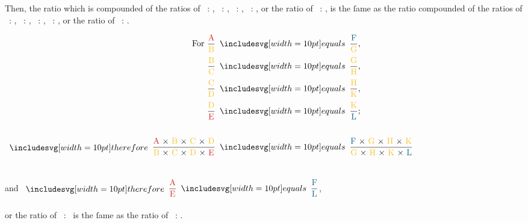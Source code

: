 \documentclass[11pt,preview]{standalone}
\begin{document}
\raggedright Then, the ratio which is compounded of the ratios of \redA\ : \yellowB, \yellowB\ : \yellowC, \yellowC\ : \yellowD, \yellowD\ : \redE, or the ratio of \redA\ : \redE, is the ſame as the ratio compounded of the ratios of \blueF\ : \yellowG, \yellowG\ : \yellowH, \yellowH\ : \yellowK, \yellowK\ : \blueL, or the ratio of \blueF\ : \blueL.

\begin{center}
    $\begin{aligned} \text{For } \dfrac{\text{\redA}}{\text{\yellowB}}                                                                      & \bequals \dfrac{\text{\blueF}}{\text{\yellowG}},                                                                      \\[0.5ex]
                \dfrac{\text{\yellowB}}{\text{\yellowC}}                                                                               & \bequals \dfrac{\text{\yellowG}}{\text{\yellowH}},                                                                    \\[0.5ex]
                \dfrac{\text{\yellowC}}{\text{\yellowD}}                                                                               & \bequals \dfrac{\text{\yellowH}}{\text{\yellowK}},                                                                    \\[0.5ex]
                \dfrac{\text{\yellowD}}{\text{\redE}}                                                                                  & \bequals \dfrac{\text{\yellowK}}{\text{\blueL}};                                                                      \\[0.5ex]
                \hfill                                                                                                                                                                                                                                         \\
                \btherefore \dfrac{\text{\redA\ × \yellowB\ × \yellowC\ × \yellowD}}{\text{\yellowB\ × \yellowC\ × \yellowD\ × \redE}} & \bequals \dfrac{\text{\blueF\ × \yellowG\ × \yellowH\ × \yellowK}}{\text{\yellowG\ × \yellowH\ × \yellowK\ × \blueL}}\end{aligned}$\\
    \hfill\\
    \hfill\\
    and $\btherefore \dfrac{\text{\redA}}{\text{\redE}} \bequals \dfrac{\text{\blueF}}{\text{\blueL}}$,\\
    \hfill\\
    or the ratio of \redA\ : \redE\ is the ſame as the ratio of \blueF\ : \blueL.
\end{center}
\end{document}
